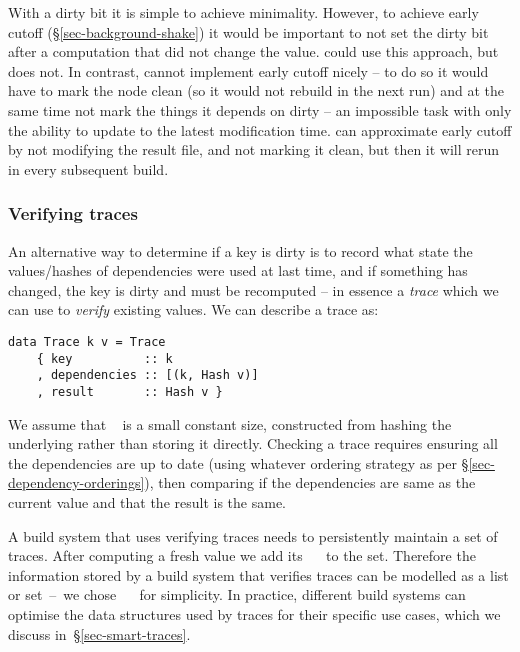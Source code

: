With a dirty bit it is simple to achieve minimality. However, to achieve early cutoff
(\S\ref{sec-background-shake}) it would be important to not set the dirty bit
after a computation that did not change the value. \Excel could use this
approach, but does not. In contrast, \Make cannot implement early cutoff nicely -- to
do so it would have to mark the node clean (so it would not rebuild in the next
run) and at the same time not mark the things it depends on dirty -- an
impossible task with only the ability to update to the latest modification time.
\Make can approximate early cutoff by not modifying the result file, and not marking it clean,
but then it will rerun in every subsequent build.

\vspace{-2mm}
\subsubsection{Verifying traces}\label{sec-verifying-traces}

An alternative way to determine if a key is dirty is to record what state the
values/hashes of dependencies were used at last time, and if something has
changed, the key is dirty and must be recomputed -- in essence a \emph{trace}
which we can use to \emph{verify} existing values. We can describe a trace as:

\begin{verbatim}
data Trace k v = Trace
    { key          :: k
    , dependencies :: [(k, Hash v)]
    , result       :: Hash v }
\end{verbatim}

We assume that ~ is a small constant size, constructed from hashing the
underlying  rather than storing it directly. Checking a trace requires
ensuring all the dependencies are up to date (using whatever ordering strategy
as per \S\ref{sec-dependency-orderings}), then comparing if the dependencies are
same as the current value and that the result is the same.

A build system that uses verifying traces needs to persistently maintain a set
of traces. After computing a fresh value we add its ~~ to
the set. Therefore the information stored by a build system that verifies
traces can be modelled as a list or set~--~we chose \hs{[Trace}~~\hs{v]}
for simplicity. In practice, different build systems can optimise the data
structures used by traces for their specific use cases, which we discuss
in~\S\ref{sec-smart-traces}.

